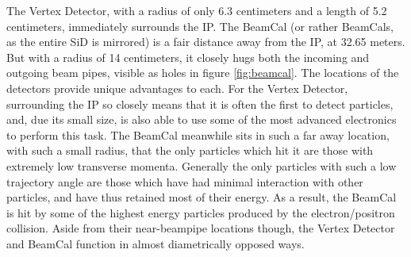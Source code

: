\documentclass{report}
\begin{document}
                The Vertex Detector, with a radius of only 6.3 centimeters and a length of 5.2 centimeters, immediately surrounds the IP. The BeamCal (or rather BeamCals, as the entire SiD is mirrored) is a fair distance away from the IP, at 32.65 meters. But with a radius of 14 centimeters, it closely hugs both the incoming and outgoing beam pipes, visible as holes in figure \ref{fig:beamcal}. The locations of the detectors provide unique advantages to each. For the Vertex Detector, surrounding the IP so closely means that it is often the first to detect particles, and, due its small size, is also able to use some of the most advanced electronics to perform this task. The BeamCal meanwhile sits in such a far away location, with such a small radius, that the only particles which hit it are those with extremely low transverse momenta. Generally the only particles with such a low trajectory angle are those which have had minimal interaction with other particles, and have thus retained most of their energy. As a result, the BeamCal is hit by some of the highest energy particles produced by the electron/positron collision. Aside from their near-beampipe locations though, the Vertex Detector and BeamCal function in almost diametrically opposed ways.
\end{document}
